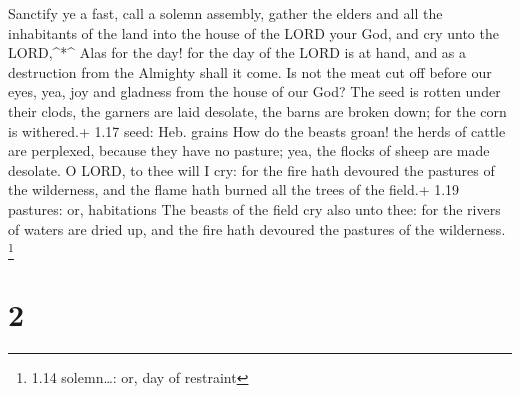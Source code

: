  Sanctify ye a fast, call a solemn assembly, gather the
elders and all the inhabitants of the land into the house of the LORD
your God, and cry unto the LORD,\^{}*\^{}  Alas for the
day! for the day of the LORD is at hand, and as a destruction from the
Almighty shall it come.  Is not the meat cut off before our
eyes, yea, joy and gladness from the house of our God?  The
seed is rotten under their clods, the garners are laid desolate, the
barns are broken down; for the corn is withered.+ 1.17 seed: Heb. grains
 How do the beasts groan! the herds of cattle are
perplexed, because they have no pasture; yea, the flocks of sheep are
made desolate.  O LORD, to thee will I cry: for the fire
hath devoured the pastures of the wilderness, and the flame hath burned
all the trees of the field.+ 1.19 pastures: or, habitations
 The beasts of the field cry also unto thee: for the rivers
of waters are dried up, and the fire hath devoured the pastures of the
wilderness. \footnote{1.14 solemn\ldots: or, day of restraint}

\hypertarget{section-1}{%
\section{2}\label{section-1}}

